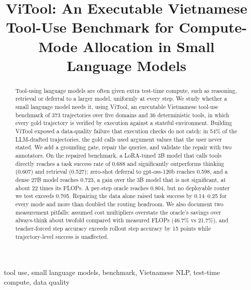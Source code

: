 \documentclass[conference,a4paper]{IEEEtran}
\begin{document}

\title{ViTool: An Executable Vietnamese Tool-Use Benchmark for Compute-Mode Allocation in Small Language Models}

\author{
}

\maketitle

\begin{abstract}
Tool-using language models are often given extra test-time compute, such as
reasoning, retrieval or deferral to a larger model, uniformly at every step. We
study whether a small language model needs it, using ViTool, an executable
Vietnamese tool-use benchmark of 373 trajectories over five domains and 36
deterministic tools, in which every gold trajectory is verified by execution
against a stateful environment. Building ViTool exposed a data-quality failure
that execution checks do not catch: in 54\% of the LLM-drafted trajectories,
the gold calls used argument values that the user never stated. We add a
grounding gate, repair the queries, and validate the repair with two
annotators. On the repaired benchmark, a LoRA-tuned 3B model that calls tools
directly reaches a task success rate of 0.688 and significantly outperforms
thinking (0.607) and retrieval (0.527); zero-shot deferral to gpt-oss-120b
reaches 0.598, and a dense 27B model reaches 0.723, a gain over the 3B model
that is not significant, at about 22 times its FLOPs. A per-step oracle reaches 0.804, but no deployable router we test
exceeds 0.705. Repairing the data alone raised task success by 0.14--0.25 for
every mode and more than doubled the routing headroom. We also document two
measurement pitfalls: assumed cost multipliers overstate the oracle's savings
over always-think about twofold compared with measured FLOPs (46.7\% vs
21.7\%), and teacher-forced step accuracy exceeds rollout step accuracy by 15
points while trajectory-level success is unaffected.
\end{abstract}

\begin{IEEEkeywords}
tool use, small language models, benchmark, Vietnamese NLP, test-time compute,
data quality
\end{IEEEkeywords}
\end{document}
